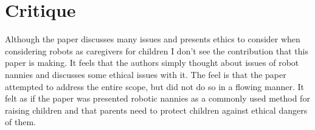 \documentclass{article}
\begin{document}
\section*{Critique}
Although the paper discusses many issues and presents ethics to consider when considering robots as caregivers for children I don't see the contribution that this paper is making. It feels that the authors simply thought about issues of robot nannies and discusses some ethical issues with it. The feel is that the paper attempted to address the entire scope, but did not do so in a flowing manner. It felt as if the paper was presented robotic nannies as a commonly used method for raising children and that parents need to protect children against ethical dangers of them.
\cite{Sharkey10thecrying}
\end{document}
